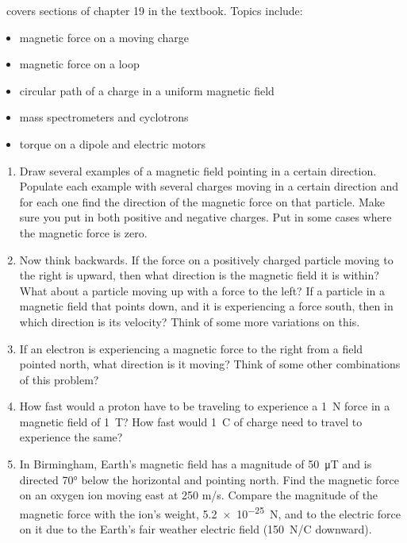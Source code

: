 \week \ covers sections of chapter 19 in the textbook. Topics include:

\begin{itemize}
	\item magnetic force on a moving charge
	\item magnetic force on a loop
	\item circular path of a charge in a uniform magnetic field
	\item mass spectrometers and cyclotrons
	\item torque on a dipole and electric motors
\end{itemize}

\begin{enumerate}
\setlength\itemsep{3 in}

\item
Draw several examples of a magnetic field pointing in a certain direction. Populate each example with several charges moving in a certain direction and for each one find the direction of the magnetic force on that particle. Make sure you put in both positive and negative charges. Put in some cases where the magnetic force is zero. 

\clearpage

\item
Now think backwards. If the force on a positively charged particle moving to the right is upward, then what direction is the magnetic field it is within? What about a particle moving up with a force to the left? If a particle in a magnetic field that points down, and it is experiencing a force south, then in which direction is its velocity? Think of some more variations on this.

\item
If an electron is experiencing a magnetic force to the right from a field pointed north, what direction is it moving? Think of some other combinations of this problem?

\item
How fast would a proton have to be traveling to experience a \SI{1}{\newton} force in a magnetic field of \SI{1}{\tesla}? How fast would \SI{1}{\coulomb} of charge need to travel to experience the same?

\item
In Birmingham, Earth's magnetic field has a magnitude of \SI{50}{\micro\tesla} and is directed \ang{70} below the horizontal and pointing north. Find the magnetic force on an oxygen ion moving east at 250 m/s. Compare the magnitude of the magnetic force with the ion's weight, \SI{5.2e-25}{\newton}, and to the electric force on it due to the Earth's fair weather electric field (\SI{150}{N/C} downward).


\end{enumerate}
